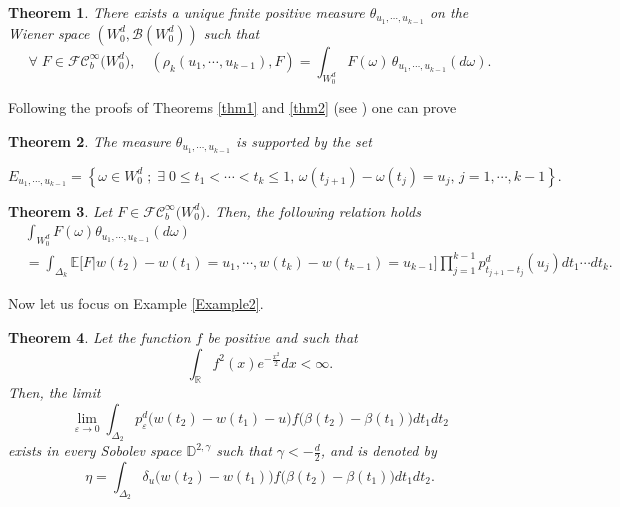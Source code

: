 \documentclass[]{interact}
\newcommand{\E}{{\mathbb{E}}}
\newcommand{\R}{{\mathbb{R}}}
\newcommand{\1}{\mathbf{1}}
\theoremstyle{plain}%
\newtheorem{thm}{Theorem}[section]
\theoremstyle{definition}
\theoremstyle{remark}
\begin{document}
\begin{thm} \label{pgwf_measure}
There exists a unique finite positive measure $\theta_{u_1,\cdots,u_{k-1}}$ on the Wiener space $(W_0^d,\mathcal{B}(W_0^d) )$ such that 
$$\forall \; F\in \mathcal{FC}_b^{\infty}\big( W_0^d\big),\quad (\rho_k(u_1,\cdots,u_{k-1}), F)=\int_{ W_0^d }  F(\omega )\,\theta_{u_1,\cdots,u_{k-1} }(d\omega).$$
\end{thm}
Following the proofs of Theorems \ref{thm1} and \ref{thm2} (see \cite{DS23}) one can prove 
\begin{thm}\label{thm109}
The measure $\theta_{u_1,\cdots,u_{k-1}}$ is supported by the set 

$$ E_ {u_1,\cdots,u_{k-1} }=\left\lbrace \omega \in W_0^d\; ; \; \exists \;0\leqslant t_1<\cdots <t_k \leqslant 1,\, \omega (t_{j+1})-\omega(t_j)=u_j,\, j=1,\cdots,k-1 \right\rbrace . $$
\end{thm}

\begin{thm} \label{thm110}
Let $F \in \mathcal{FC}_b^{\infty}\big( W_0^d\big) $. Then, the following relation holds
\begin{align*}
&\int_{W_0^d  } F(\omega) \theta_{u_1,\cdots,u_{k-1}} (d\omega) \\
&= \int_{\Delta_k  } \E \Big[F\Big | w(t_2)-w(t_1)=u_1,\cdots,w(t_k)-w(t_{k-1})=u_{k-1} \Big] \prod_{j=1}^{k-1}  p^d_{t_{j+1}- t_j }( u_j)dt_1\cdots dt_k .
\end{align*}
\end{thm}


Now let us focus on Example \ref{Example2}.


\begin{thm} \label{thm77}
Let the function $f$ be positive and such that 
$$ \int_{\R} f^2(x)e^{-\frac{x^2}{2}}dx <\infty. $$
Then, the limit
$$ 
\lim_{\varepsilon \to 0} \int_{\Delta_2  }  p^d_{\varepsilon}\big( w(t_2)-w(t_1)-u\big)f\big( \beta(t_2)-\beta(t_1)\big )    dt_1dt_2 $$
exists in every Sobolev space $\mathbb{D}^{2,\gamma}$ such that $\gamma <-\frac{d}{2} $, and is denoted by 
$$ \eta=\int _{\Delta_2} \delta_u \big(w(t_2)-w(t_1) \big) f\big( \beta(t_2)-\beta(t_1)\big ) dt_1dt_2 .$$
\end{thm}
\end{document}

